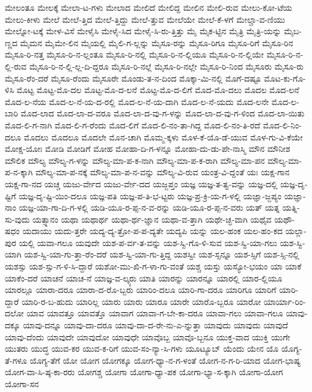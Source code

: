 {ಮೇಲಂತೂ
ಮೇಲಕ್ಕೆ
ಮೇಲಾ-ಟ-ಗಳು
ಮೇಲಾದ
ಮೇಲಿದೆ
ಮೇಲಿದ್ದ
ಮೇಲಿನ
ಮೇಲಿ-ರುವ
ಮೇಲು-ಕೋ-ಟೆಯ
ಮೇಲು-ಕೀಳು
ಮೇಲೆ
ಮೇಲೆ-ತ್ತಿದ
ಮೇಲೆ-ತ್ತಿದ್ದು
ಮೇಲೆ-ತ್ತುವ
ಮೇಲೆಯೇ
ಮೇಲೆ-ಕೆ-ಳಗೆ
ಮೇಲ್ಚಾ-ವ-ಣಿಯು
ಮೇಲ್ನೋ-ಟಕ್ಕೆ
ಮೇಳ-ವಿಸೆ
ಮೇಳೈಸಿ
ಮೇಳೈ-ಸಿದ
ಮೇಳೈ-ಸಿ-ರು-ತ್ತಿತ್ತು
ಮೈ
ಮೈಕ-ಟ್ಟಿನ
ಮೈತ್ರಿ
ಮೈತ್ರಿ-ಯನ್ನು
ಮೈಬ-ಣ್ಣದ
ಮೈಮನ
ಮೈಮೇ-ಲಿನ
ಮೈಯಲ್ಲಿ
ಮೈಲಿ-ಗ-ಲ್ಲನ್ನು
ಮೈಸೂ-ರನ್ನು
ಮೈಸೂ-ರಿಗೂ
ಮೈಸೂ-ರಿಗೆ
ಮೈಸೂ-ರಿನ
ಮೈಸೂ-ರಿ-ನತ್ತ
ಮೈಸೂ-ರಿ-ನ-ಲ್ಲಂತೂ
ಮೈಸೂ-ರಿ-ನಲ್ಲಿ
ಮೈಸೂ-ರಿ-ನ-ಲ್ಲಿಯೂ
ಮೈಸೂ-ರಿ-ನ-ಲ್ಲಿಯೇ
ಮೈಸೂ-ರಿ-ನ-ಲ್ಲಿ-ರುವ
ಮೈಸೂ-ರಿ-ನ-ಲ್ಲಿ-ಲ್ಲ-ದಿ-ದ್ದರೂ
ಮೈಸೂ-ರಿ-ನಲ್ಲೆ
ಮೈಸೂ-ರಿ-ನಲ್ಲೇ
ಮೈಸೂ-ರಿ-ನಿಂದ
ಮೈಸೂರು
ಮೈಸೂ-ರು				
ಮೈಸೂ-ರೆಂ-ದರೆ
ಮೈಸೂ-ರೆಂದು
ಮೈಸೂರೇ
ಮೊಂಡು-ತ-ನ-ದಿಂದ
ಮೊಕ್ಕಾ-ಮಿ-ನಲ್ಲಿ
ಮೊಗೆ-ದಷ್ಟೂ
ಮೊಟ-ಕು-ಗೊ-ಳಿಸಿ
ಮೊಟ್ಟ
ಮೊಟ್ಟ-ಮೊ-ದಲ
ಮೊಟ್ಟ-ಮೊ-ದ-ಲನೆ
ಮೊಟ್ಟ-ಮೊ-ದ-ಲಿಗೆ
ಮೊದ-ಮೊ-ದಲು
ಮೊದಲ
ಮೊದ-ಲನೆ
ಮೊದ-ಲ-ನೆಯ
ಮೊದ-ಲ-ನೆ-ಯ-ದ-ರಲ್ಲಿ
ಮೊದ-ಲ-ನೆ-ಯ-ದಾಗಿ
ಮೊದ-ಲ-ನೆ-ಯದು
ಮೊದ-ಲನೇ
ಮೊದ-ಲ-ಬಾರಿ
ಮೊದ-ಲಾದ
ಮೊದ-ಲಾ-ದ-ವರೂ
ಮೊದ-ಲಾ-ದ-ವು-ಗ-ಳನ್ನು
ಮೊದ-ಲಾ-ದ-ವು-ಗ-ಳಿಂದ
ಮೊದ-ಲಾ-ಯಿತು
ಮೊದ-ಲಿ-ಗ-ನಾಗಿ
ಮೊದ-ಲಿ-ಗ-ರೆಂದು
ಮೊದ-ಲಿಗೆ
ಮೊದ-ಲಿ-ನಂ-ತಾ-ಗಿದ್ದ
ಮೊದ-ಲಿ-ನಂ-ತಿ-ರದೆ
ಮೊದ-ಲಿ-ನಿಂ-ದಲೂ
ಮೊದಲು
ಮೊದಲೂ
ಮೊದಲೇ
ಮೊನ-ಚಾಗಿ
ಮೊಮ್ಮ-ಕ್ಕಳು
ಮೊಳ-ಕೆ-ಯೊ-ಡೆ-ಯುವ
ಮೊಳ-ಗು-ವಿ-ಕೆಯೇ
ಮೋಕ್ಷ-ಯೋಃ
ಮೋಡಿ
ಮೋಡಿಗೆ
ಮೋಹ
ಮೋಹಾ-ದಿ-ಗ-ಳನ್ನೂ
ಮೋಹಾ-ದು-ಡು-ಪೇ-ನಾಸ್ಮಿ
ಮೌನ
ಮೌನೀಶ
ಮೌಲಿಕ
ಮೌಲ್ಯ
ಮೌಲ್ಯ-ಗ-ಳನ್ನು
ಮೌಲ್ಯ-ಮಾ-ಪ-ಕ-ನಾಗಿ
ಮೌಲ್ಯ-ಮಾ-ಪ-ಕ-ರಾಗಿ
ಮೌಲ್ಯ-ಮಾ-ಪನ
ಮೌಲ್ಯ-ಮಾ-ಪ-ನ-ಕ್ಕಾಗಿ
ಮೌಲ್ಯ-ಮಾ-ಪ-ನಕ್ಕೆ
ಮೌಲ್ಯ-ಮಾ-ಪ-ನ-ವನ್ನು
ಮೌಲ್ಯ-ವಿ-ರುವ
ಯಂತ್ರ-ವಿ-ದ್ದಂತೆ
ಯಃ
ಯಕ್ಷ-ಗಾನ
ಯಕ್ಷ-ಗಾ-ನದ
ಯಚ್ಚ
ಯಜು-ರ್ವೇದ
ಯಜು-ರ್ವೇ-ದದ
ಯಜ್ಜಪ್ತಂ
ಯಜ್ಞ
ಯಜ್ಞ-ತ-ತ್ವ-ವನ್ನು
ಯಜ್ಞ-ದಲ್ಲಿ
ಯಜ್ಞ-ದೃ-ಷ್ಟಿಗೆ
ಯಜ್ಞ-ದೃ-ಷ್ಟಿ-ಯಿಂ-ದಲೂ
ಯಜ್ಞ-ಪತಿ
ಯಜ್ಞ-ಪ-ತಿ-ಭ-ಟ್ಟರು
ಯಜ್ಞ-ಪ್ರ-ಕ್ರಿ-ಯ-ಗ-ಳಲ್ಲಿ
ಯಜ್ಞಾ-ಜ್ಜಪ್ಯಂ
ಯಜ್ಞಾ-ನಾಂ
ಯಜ್ಞ-ಯಾ-ಗಾ-ದಿ-ಗ-ಳಲ್ಲಿ
ಯಡಿ-ಯೂ-ರ-ಪ್ಪ-ನ-ವ-ರನ್ನು
ಯಡಿ-ಯೂ-ರ-ಪ್ಪ-ನ-ವರು
ಯತ್
ಯತ್ನ
ಯತ್ನಿ-ಸು-ವುದು
ಯತ್ಸ್ನಾನಂ
ಯಥಾ
ಯಥಾರ್ಥ
ಯಥಾ-ರ್ಥ-ಜ್ಞಾನ
ಯಥಾ-ವ-ತ್ತಾಗಿ
ಯಥೇ-ಚ್ಛ-ವಾಗಿ
ಯಥೈವ
ಯಥೌ-ಷಧಂ
ಯದಾಯು
ಯದು-ತ್ತರೇ
ಯದ್ಯ-ದ್ಯ-ತ್ರೋ-ಪ-ಪ-ದ್ಯತೇ
ಯದ್ಯಪಿ
ಯನ್ನು
ಯಲ-ಹಂಕ
ಯಲ-ಹಂ-ಕದ
ಯಲ್ಲಾ-ಪುರ
ಯಲ್ಲಿ
ಯವಾ-ಗಲೂ
ಯವುದೇ
ಯಶ-ಪ-ರ್ವ-ತ-ವನ್ನು
ಯಶ-ಸ್ವಿ-ಗೊ-ಳಿ-ಸುವ
ಯಶ-ಸ್ವಿ-ಯಾ-ಗಲು
ಯಶ-ಸ್ವಿ-ಯಾಗಿ
ಯಶ-ಸ್ವಿ-ಯಾ-ಗು-ತ್ತಾ-ರೆಂ-ದರೆ
ಯಶ-ಸ್ವಿ-ಯಾ-ಗು-ತ್ತಿದ್ದ
ಯಶಸ್ವೀ
ಯಶ-ಸ್ಸನ್ನೂ
ಯಶ-ಸ್ಸಿಗೆ
ಯಶ-ಸ್ಸಿ-ನಲ್ಲಿ
ಯಶಸ್ಸು
ಯಶ-ಸ್ಸು-ಗ-ಳಿ-ಸಿ-ದ್ದಾರೆ
ಯಶೋ-ಮು-ಖಿ-ಗ-ಳಾ-ಗು-ವಂತೆ
ಯಶ್ಚ
ಯಸ್ತು
ಯಸ್ಯೋ-ಭಯಂ
ಯಾ
ಯಾಕೆ
ಯಾಕೆಂ-ದರೆ
ಯಾಚನೆ
ಯಾಚ-ನೆ
ಯಾಜ್ಞ-ವ-ಲ್ಕ್ಯರು
ಯಾತಿ
ಯಾರನ್ನು
ಯಾರನ್ನೂ
ಯಾರಲ್ಲಿ
ಯಾರ-ಲ್ಲಿಯೂ
ಯಾರಲ್ಲೂ
ಯಾರಾ-ದರೂ
ಯಾರಾ-ದ-ರೊ-ಬ್ಬರು
ಯಾರಿಂ-ದಲೂ
ಯಾರಿ-ಗಾ-ದರೂ
ಯಾರಿಗೂ
ಯಾರಿಗೆ
ಯಾರಿ-ದ್ದಾರೆ
ಯಾರಿ-ರ-ಬ-ಹುದು
ಯಾರಿಲ್ಲ
ಯಾರು
ಯಾರು
ಯಾರೂ
ಯಾರೇ
ಯಾರೊ-ಬ್ಬರೂ
ಯಾರೋ
ಯಾರ್ಯಾ-ರಿಂ-ದಲೋ
ಯಾವ
ಯಾವತ್ತೂ
ಯಾವತ್ತೊ
ಯಾವಾಗ
ಯಾವಾ-ಗ-ಬೇ-ಕಾ-ದರೂ
ಯಾವಾ-ಗಲು
ಯಾವಾ-ಗಲೂ
ಯಾವು-ದಕ್ಕೂ
ಯಾವು-ದನ್ನೂ
ಯಾವು-ದಾ-ದರೂ
ಯಾವು-ದಾ-ದ-ರೇ-ನು-ಎ-ನ್ನುತ್ತಾ
ಯಾವುದು
ಯಾವುದು
ಯಾವುದೆ
ಯಾವು-ದೆಂದು
ಯಾವುದೇ
ಯಾವುದೋ
ಯಾವುಧೇ
ಯಾವೊಬ್ಬ
ಯಾವೊ-ಬ್ಬನೂ
ಯುಕ್ತ-ವಾದ
ಯುಕ್ತಿ
ಯುಗೇ
ಯುತರು
ಯುದ್ಧ
ಯುವ-ಕರ
ಯುವ-ಕ-ರಿಗೆ
ಯುವ-ಸಂ-ನ್ಯಾ-ಸಿ-ಗಳು
ಯೂಟ್ಯೂಬ್
ಯೆಂದು
ಯೇನ
ಯೊ
ಯೊಗ್ಯ-ತೆ-ಗಳೂ
ಯೊಗ್ಯ-ತೆಗೆ
ಯೋ
ಯೋಗ
ಯೋಗಕ್ಕೂ
ಯೋಗ-ಧ್ಯಾ-ನ-ಗ-ಳಂತೆ
ಯೋಗ-ನ-ಗ-ರಿ-ಯಾದ
ಯೋಗ-ಭಾಷ್ಯ
ಯೋಗ-ವಾ-ಸಿ-ಷ್ಠ-ಕಾ-ರರು
ಯೋಗಶ್ಚ
ಯೋಗಾ
ಯೋಗಾ-ಧ್ಯಾ-ಪಕ
ಯೋಗಾ-ಭ್ಯಾ-ಸ-ಕ್ಕಾಗಿ
ಯೋಗಾ-ಯೋಗ
ಯೋಗಾ-ಸನ
}
